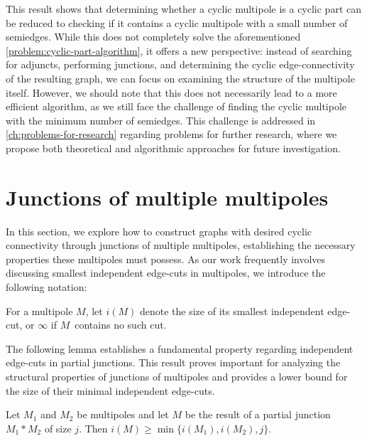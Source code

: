 \documentclass[12pt, twoside]{book}
\begin{document}
This result shows that determining whether a cyclic multipole is a cyclic part can be reduced to checking if it contains a cyclic multipole with a small number of semiedges. While this does not completely solve the aforementioned \cref{problem:cyclic-part-algorithm}, it offers a new perspective: instead of searching for adjuncts, performing junctions, and determining the cyclic edge-connectivity of the resulting graph, we can focus on examining the structure of the multipole itself. However, we should note that this does not necessarily lead to a more efficient algorithm, as we still face the challenge of finding the cyclic multipole with the minimum number of semiedges. This challenge is addressed in \cref{ch:problems-for-research} regarding problems for further research, where we propose both theoretical and algorithmic approaches for future investigation.

\section{Junctions of multiple multipoles}\label{sec:junction-multiple-results}

In this section, we explore how to construct graphs with desired cyclic connectivity through junctions of multiple multipoles, establishing the necessary properties these multipoles must possess. As our work frequently involves discussing smallest independent edge-cuts in multipoles, we introduce the following notation:

\begin{definition}
	For a multipole $M$, let $i(M)$ denote the size of its smallest independent edge-cut, or $\infty$ if $M$~contains no such cut.
\end{definition}

The following lemma establishes a fundamental property regarding independent edge-cuts in partial junctions. This result proves important for analyzing the structural properties of junctions of multipoles and provides a lower bound for the size of their minimal independent edge-cuts.

\begin{lemma}\label{lem:size-of-minimal-independent-after-junction}
	Let $M_1$ and $M_2$ be multipoles and let $M$ be the result of a partial junction $M_1*M_2$ of size $j$. Then $i(M)\geq \min\{i(M_1),i(M_2),j\}$.
\end{lemma}
\end{document}
